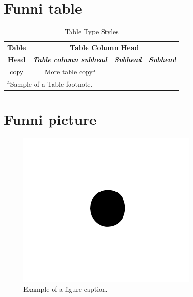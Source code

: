 \documentclass[conference]{IEEEtran}
\begin{document}
\section{Funni table}

\begin{table}[htbp]
\caption{Table Type Styles}
\begin{center}
\begin{tabular}{|c|c|c|c|}
\hline
\textbf{Table}&\multicolumn{3}{|c|}{\textbf{Table Column Head}} \\
\cline{2-4} 
\textbf{Head} & \textbf{\textit{Table column subhead}}& \textbf{\textit{Subhead}}& \textbf{\textit{Subhead}} \\
\hline
copy& More table copy$^{\mathrm{a}}$& &  \\
\hline
\multicolumn{4}{l}{$^{\mathrm{a}}$Sample of a Table footnote.}
\end{tabular}
\label{tab1}
\end{center}
\end{table}

\section{Funni picture}

\begin{figure}[htbp]
\centerline{\includegraphics{fig1.png}}
\caption{Example of a figure caption.}
\label{fig}
\end{figure}
\end{document}
